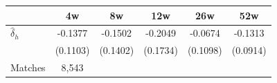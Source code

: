 \begin{tabular}{l*{5}{c}}
\toprule
 & 4w & 8w & 12w & 26w & 52w \\
\midrule
$\hat{\delta}_h$ & -0.1377 & -0.1502 & -0.2049 & -0.0674 & -0.1313 \\
 & (0.1103) & (0.1402) & (0.1734) & (0.1098) & (0.0914) \\
\midrule
Matches & 8,543 \\
\bottomrule
\end{tabular}
